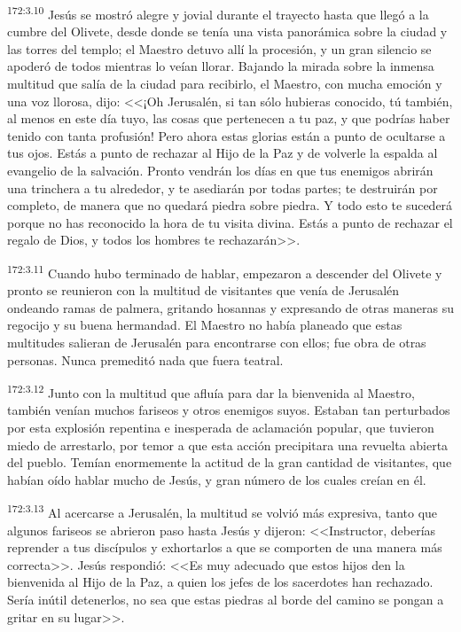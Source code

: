 \par 
\textsuperscript{172:3.10} Jesús se mostró alegre y jovial durante el trayecto hasta que llegó a la cumbre del Olivete, desde donde se tenía una vista panorámica sobre la ciudad y las torres del templo; el Maestro detuvo allí la procesión, y un gran silencio se apoderó de todos mientras lo veían llorar. Bajando la mirada sobre la inmensa multitud que salía de la ciudad para recibirlo, el Maestro, con mucha emoción y una voz llorosa, dijo: <<¡Oh Jerusalén, si tan sólo hubieras conocido, tú también, al menos en este día tuyo, las cosas que pertenecen a tu paz, y que podrías haber tenido con tanta profusión! Pero ahora estas glorias están a punto de ocultarse a tus ojos. Estás a punto de rechazar al Hijo de la Paz y de volverle la espalda al evangelio de la salvación. Pronto vendrán los días en que tus enemigos abrirán una trinchera a tu alrededor, y te asediarán por todas partes; te destruirán por completo, de manera que no quedará piedra sobre piedra. Y todo esto te sucederá porque no has reconocido la hora de tu visita divina. Estás a punto de rechazar el regalo de Dios, y todos los hombres te rechazarán>>.

\par 
\textsuperscript{172:3.11} Cuando hubo terminado de hablar, empezaron a descender del Olivete y pronto se reunieron con la multitud de visitantes que venía de Jerusalén ondeando ramas de palmera, gritando hosannas y expresando de otras maneras su regocijo y su buena hermandad. El Maestro no había planeado que estas multitudes salieran de Jerusalén para encontrarse con ellos; fue obra de otras personas. Nunca premeditó nada que fuera teatral.

\par 
\textsuperscript{172:3.12} Junto con la multitud que afluía para dar la bienvenida al Maestro, también venían muchos fariseos y otros enemigos suyos. Estaban tan perturbados por esta explosión repentina e inesperada de aclamación popular, que tuvieron miedo de arrestarlo, por temor a que esta acción precipitara una revuelta abierta del pueblo. Temían enormemente la actitud de la gran cantidad de visitantes, que habían oído hablar mucho de Jesús, y gran número de los cuales creían en él.

\par 
\textsuperscript{172:3.13} Al acercarse a Jerusalén, la multitud se volvió más expresiva, tanto que algunos fariseos se abrieron paso hasta Jesús y dijeron: <<Instructor, deberías reprender a tus discípulos y exhortarlos a que se comporten de una manera más correcta>>. Jesús respondió: <<Es muy adecuado que estos hijos den la bienvenida al Hijo de la Paz, a quien los jefes de los sacerdotes han rechazado. Sería inútil detenerlos, no sea que estas piedras al borde del camino se pongan a gritar en su lugar>>.

